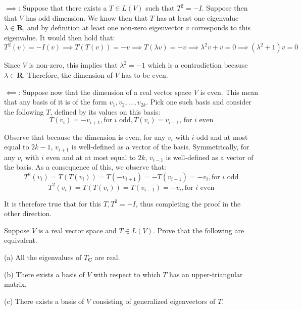 \begin{solution}

    $\implies$: Suppose that there exists a $T \in L(V)$ such that $T^2 = -I$. Suppose then that $V$ has odd dimension. We know then that $T$ has at least one eigenvalue $\lambda \in \mathbf{R}$, and by definition at least one non-zero eigenvector $v$ corresponds to this eigenvalue. It would then hold that:
    $$T^2(v) = -I(v) \implies T(T(v)) = -v \implies T(\lambda v) = -v \implies \lambda^2v + v = 0 \implies (\lambda^2+1)v = 0$$

    Since $V$ is non-zero, this implies that $\lambda^2 = -1$ which is a contradiction because $\lambda \in \mathbf{R}$. Therefore, the dimension of $V$ has to be even.

    $\impliedby$: Suppose now that the dimension of a real vector space $V$ is even. This mean that any basis of it is of the form $v_1, v_2, \ldots, v_{2k}$. Pick one such basis and consider the following $T$, defined by its values on this basis:
    $$T(v_i) = -v_{i+1}, \text{for $i$ odd}, T(v_i) = v_{i-1} \text{, for $i$ even}$$

    Observe that because the dimension is even, for any $v_i$ with $i$ odd and at most equal to $2k-1$, $v_{i+1}$ is well-defined as a vector of the basis. Symmetrically, for any $v_i$ with $i$ even and at at most equal to $2k$, $v_{i-1}$ is well-defined as a vector of the basis. As a consequence of this, we observe that:
    $$T^2(v_i) = T(T(v_i)) = T(-v_{i+1}) = -T(v_{i+1}) = -v_i, \text{for $i $ odd} $$
    $$T^2(v_i) = T(T(v_i)) = T(v_{i-1}) = -v_i, \text{for $i$ even}$$

    It is therefore true that for this $T, T^2=-I$, thus completing the proof in the other direction.
\end{solution}

\begin{exercise}{18}
    Suppose $V$ is a real vector space and $T \in L(V)$. Prove that the following are equivalent.

    (a) All the eigenvalues of $T_\mathbf{C}$ are real.

    (b) There exists a basis of $V$ with respect to which $T$ has an upper-triangular matrix.

    (c) There exists a basis of $V$ consisting of generalized eigenvectors of $T$.
\end{exercise}


